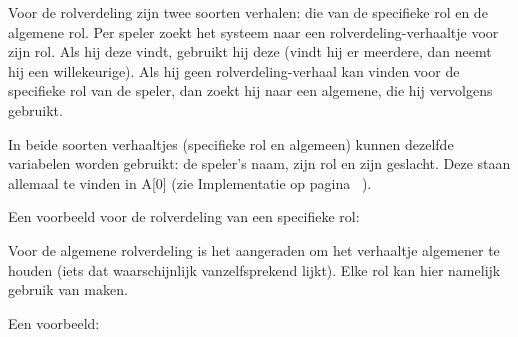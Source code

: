 \documentclass[12pt]{article}
\begin{document}
    Voor de rolverdeling zijn twee soorten verhalen: die van de specifieke rol en de algemene rol. Per speler zoekt het systeem naar een rolverdeling-verhaaltje voor zijn rol. Als hij deze vindt, gebruikt hij deze (vindt hij er meerdere, dan neemt hij een willekeurige). Als hij geen rolverdeling-verhaal kan vinden voor de specifieke rol van de speler, dan zoekt hij naar een algemene, die hij vervolgens gebruikt.
    
    In beide soorten verhaaltjes (specifieke rol en algemeen) kunnen dezelfde variabelen worden gebruikt: de speler's naam, zijn rol en zijn geslacht. Deze staan allemaal te vinden in A[0] (zie Implementatie op pagina~\pageref{subsec:Variabelen} ).
    
    Een voorbeeld voor de rolverdeling van een specifieke rol:
    
    \begin{center}
    \end{center}
      
    Voor de algemene rolverdeling is het aangeraden om het verhaaltje algemener te houden (iets dat waarschijnlijk vanzelfsprekend lijkt). Elke rol kan hier namelijk gebruik van maken. 
    
    Een voorbeeld:
    
    \begin{center}
    \end{center}
    
\end{document}
